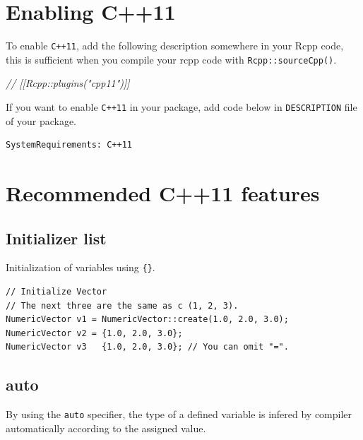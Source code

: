 \documentclass[]{book}
\newenvironment{Shaded}{\begin{snugshade}}{\end{snugshade}}
\newcommand{\CommentTok}[1]{\textcolor[rgb]{0.56,0.35,0.01}{\textit{#1}}}
\begin{document}
\hypertarget{enabling-c11}{%
\section{Enabling C++11}\label{enabling-c11}}

To enable \texttt{C++11}, add the following description somewhere in your Rcpp code, this is sufficient when you compile your rcpp code with \texttt{Rcpp::sourceCpp()}.

\begin{Shaded}
\begin{Highlighting}[]
\CommentTok{// [[Rcpp::plugins("cpp11")]]}
\end{Highlighting}
\end{Shaded}

If you want to enable \texttt{C++11} in your package, add code below in \texttt{DESCRIPTION} file of your package.

\begin{verbatim}
SystemRequirements: C++11
\end{verbatim}

\hypertarget{recommended-c11-features}{%
\section{Recommended C++11 features}\label{recommended-c11-features}}

\hypertarget{initializer-list}{%
\subsection{Initializer list}\label{initializer-list}}

Initialization of variables using \texttt{\{\}}.

\begin{verbatim}
// Initialize Vector
// The next three are the same as c (1, 2, 3).
NumericVector v1 = NumericVector::create(1.0, 2.0, 3.0);
NumericVector v2 = {1.0, 2.0, 3.0};
NumericVector v3   {1.0, 2.0, 3.0}; // You can omit "=".
\end{verbatim}

\hypertarget{auto}{%
\subsection{auto}\label{auto}}

By using the \texttt{auto} specifier, the type of a defined variable is infered by compiler automatically according to the assigned value.
\end{document}
